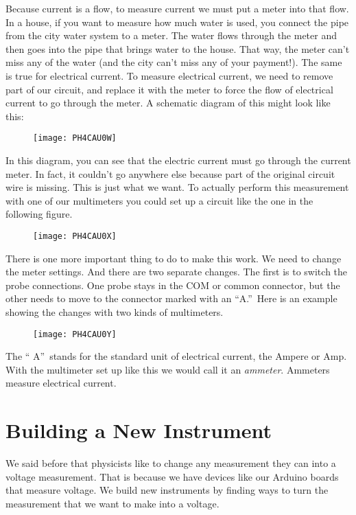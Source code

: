 Because current is a flow, to measure current we must put a meter into that
flow. In a house, if you want to measure how much water is used, you connect
the pipe from the city water system to a meter. The water flows through the
meter and then goes into the pipe that brings water to the house. That way,
the meter can't miss any of the water (and the city can't miss any of your
payment!). The same is true for electrical current. To measure electrical
current, we need to remove part of our circuit, and replace it with the
meter to force the flow of electrical current to go through the meter. A
schematic diagram of this might look like this: \begin{figure}[h!]
\texttt{[image: PH4CAU0W]}
\end{figure}In this diagram, you can see that
the electric current must go through the current meter. In fact, it couldn't
go anywhere else because part of the original circuit wire is missing. This
is just what we want. To actually perform this measurement with one of our
multimeters you could set up a circuit like the one in the following figure. 
\begin{figure}[h!]
\texttt{[image: PH4CAU0X]}
\end{figure}There is one more important thing
to do to make this work. We need to change the meter settings. And there are
two separate changes. The first is to switch the probe connections. One
probe stays in the COM or common connector, but the other needs to move to
the connector marked with an \textquotedblleft A.\textquotedblright\ Here is
an example showing the changes with two kinds of multimeters. \begin{figure}[h!]
\texttt{[image: PH4CAU0Y]}
\end{figure}The \textquotedblleft
A\textquotedblright\ stands for the standard unit of electrical current, the
Ampere or Amp. With the multimeter set up like this we would call it an 
\emph{ammeter}. Ammeters measure electrical current.

\section{Building a New Instrument}

We said before that physicists like to change any measurement they can into
a voltage measurement. That is because we have devices like our Arduino
boards that measure voltage. We build new instruments by finding ways to
turn the measurement that we want to make into a voltage.

